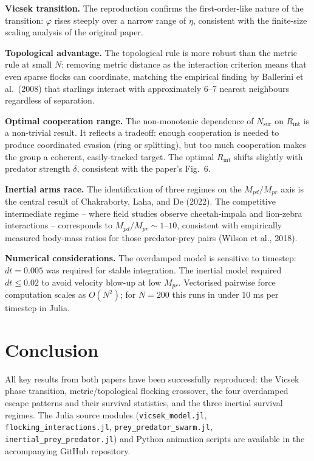 \documentclass[11pt,a4paper]{article}
\begin{document}
\textbf{Vicsek transition.} The reproduction confirms the first-order-like
nature of the transition: $\varphi$ rises steeply over a narrow range of
$\eta$, consistent with the finite-size scaling analysis of the original paper.

\textbf{Topological advantage.} The topological rule is more robust than
the metric rule at small $N$: removing metric distance as the interaction
criterion means that even sparse flocks can coordinate, matching the
empirical finding by Ballerini et al.\ (2008) that starlings interact with
approximately 6--7 nearest neighbours regardless of separation.

\textbf{Optimal cooperation range.} The non-monotonic dependence of
$N_\mathrm{sur}$ on $R_\mathrm{int}$ is a non-trivial result. It reflects
a tradeoff: enough cooperation is needed to produce coordinated evasion
(ring or splitting), but too much cooperation makes the group a coherent,
easily-tracked target. The optimal $R_\mathrm{int}$ shifts slightly with
predator strength $\delta$, consistent with the paper's Fig.\ 6.

\textbf{Inertial arms race.} The identification of three regimes on the
$M_{pd}/M_{pr}$ axis is the central result of Chakraborty, Laha, and De
(2022). The competitive intermediate regime -- where field studies observe
cheetah-impala and lion-zebra interactions -- corresponds to $M_{pd}/M_{pr}
\sim 1$--$10$, consistent with empirically measured body-mass ratios for
those predator-prey pairs (Wilson et al., 2018).

\textbf{Numerical considerations.} The overdamped model is sensitive to
timestep: $dt=0.005$ was required for stable integration. The inertial model
required $dt\leq 0.02$ to avoid velocity blow-up at low $M_{pr}$. Vectorised
pairwise force computation scales as $O(N^2)$; for $N=200$ this runs in
under 10 ms per timestep in Julia.

\section{Conclusion}

All key results from both papers have been successfully reproduced:
the Vicsek phase transition, metric/topological flocking crossover,
the four overdamped escape patterns and their survival statistics, and
the three inertial survival regimes. The Julia source modules
(\texttt{vicsek\_model.jl}, \texttt{flocking\_interactions.jl},
\texttt{prey\_predator\_swarm.jl}, \texttt{inertial\_prey\_predator.jl})
and Python animation scripts are available in the accompanying GitHub
repository.
\end{document}
